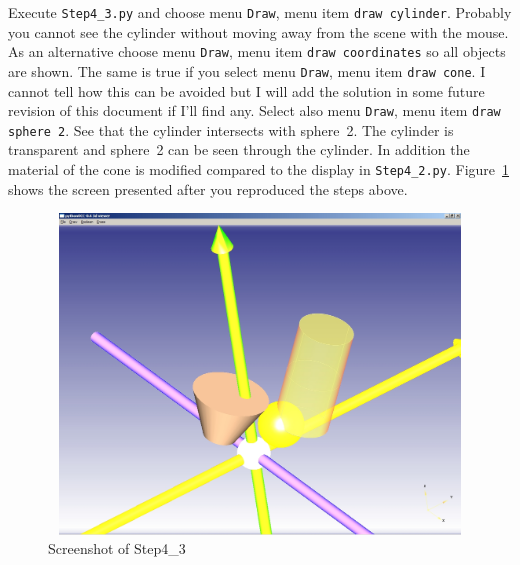 Execute {\tt Step4\_3.py} and choose menu {\tt Draw}, menu item {\tt draw cylinder}.
Probably you cannot see the cylinder without moving away from the scene with the mouse.
As an alternative choose menu {\tt Draw}, menu item {\tt draw coordinates} so all objects are shown.
The same is true if you select menu {\tt Draw}, menu item {\tt draw cone}.
I cannot tell how this can be avoided but I will add the solution in some future revision of this document if I'll find any.
Select also  menu {\tt Draw}, menu item {\tt draw sphere 2}.
See that the cylinder intersects with sphere~2.
The cylinder is transparent and sphere~2 can be seen through the cylinder.
In addition the material of the cone is modified compared to the display in {\tt Step4\_2.py}.
Figure~\ref{STEP_4_3_SCREEN} shows the screen presented after you reproduced the steps above.
\begin{figure}[h]
\begin{center}
\includegraphics[height=8.5cm,width=11.3cm]{Step4_3.jpg}
\end{center}
\caption[Screenshot of Step4\_3]{\label{STEP_4_3_SCREEN}Screenshot of Step4\_3}
\end{figure}

